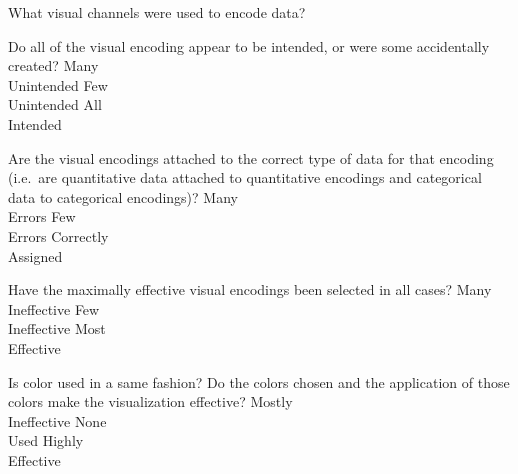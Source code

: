 \documentclass[a4paper,12pt]{article}
\begin{document}

	{What visual channels were used to encode data? }
    { 
    }
        
	{Do all of the visual encoding appear to be intended, or were some accidentally created?}
        {\choice Many\\Unintended}
        {\choice Few\\Unintended}
        {\choice All\\Intended} 
        
	{Are the visual encodings attached to the correct type of data for that 
    	encoding (i.e.\ are quantitative data attached to quantitative 
        encodings and categorical data to categorical encodings)?}
    {\choice Many\\Errors}
    {\choice Few\\Errors}
    {\choice Correctly\\Assigned} 
            
	{Have the maximally effective visual encodings been selected in all cases? }
    {\choice Many\\Ineffective}
    {\choice Few\\Ineffective}
    {\choice Most\\Effective} 
        
	{Is color used in a same fashion? Do the colors chosen and the application 
    	of those colors make the visualization effective?}
    {\choice Mostly\\Ineffective}
    {\choice None\\Used}
    {\choice Highly\\Effective} 
\end{document}
